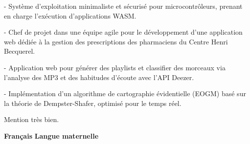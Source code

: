 \documentclass[10pt,a4paper,ragged2e,withhyper]{../AltaCV/altacv}
\begin{document}
\begin{paracol}{2}

  \begin{minipage}[t]{0.49\linewidth}
    {\small {} - Système d'exploitation minimaliste et sécurisé pour microcontrôleurs, prenant en charge l’exécution d’applications WASM.}

    \divider

    {\small {} - Chef de projet dans une équipe agile pour le développement d'une application web dédiée à la gestion des prescriptions des pharmaciens du Centre Henri Becquerel.}
  \end{minipage}
  \hfill
  \begin{minipage}[t]{0.49\linewidth}
    {\small {} - Application web pour générer des playlists et classifier des morceaux via l’analyse des MP3 et des habitudes d’écoute avec l’API Deezer.}

    \divider

    {\small {} - Implémentation d’un algorithme de cartographie évidentielle (EOGM) basé sur la théorie de Dempster-Shafer, optimisé pour le temps réel.}
  \end{minipage}

  \medskip

  \switchcolumn



  \divider

  Mention très bien.
  
  \divider
  
  

  \textcolor{emphasis}{\textbf{Français}} \hfill \textbf{Langue maternelle}\\


\end{paracol}
\end{document}
